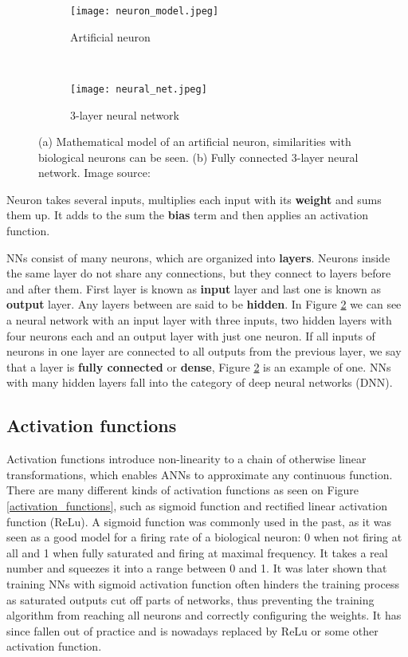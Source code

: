 \begin{figure}[ht] 
    \begin{subfigure}[b]{0.5\textwidth}
        \centering
        \texttt{[image: neuron\_model.jpeg]} 
        \caption{Artificial neuron}
        \label{neuron_model}
    \end{subfigure}
    \unskip\ \vrule\ 
    \begin{subfigure}[b]{0.5\textwidth}
        \centering
        \texttt{[image: neural\_net.jpeg]} 
        \caption{ 3-layer neural network}
        \label{neural_net}
    \end{subfigure}
    
    \caption{ (a) Mathematical model of an artificial neuron, similarities with biological neurons can be seen. (b) Fully connected 3-layer neural network. Image source: \cite{cs231n}}
    \label{neural}
\end{figure}

Neuron takes several inputs, multiplies each input with its \textbf{weight} and sums them up.
It adds to the sum the \textbf{bias} term and then applies an activation function.

NNs consist of many neurons, which are organized into \textbf{layers}.
Neurons inside the same layer do not share any connections, but they connect to layers before and after them.
First layer is known as \textbf{input} layer and last one is known as \textbf{output} layer. 
Any layers between are said to be \textbf{hidden}. 
In Figure \ref{neural_net} we can see a neural network with an input layer with three inputs, two hidden layers with four neurons each and an output layer with just one neuron.
If all inputs of neurons in one layer are connected to all outputs from the previous layer, we say that a layer is \textbf{fully connected} or \textbf{dense}, Figure \ref{neural_net} is an example of one.
NNs with many hidden layers fall into the category of deep neural networks (DNN).


\subsection{ Activation functions}

Activation functions introduce non-linearity to a chain of otherwise linear transformations, which enables ANNs to approximate any continuous function\cite{geron}.
There are many different kinds of activation functions as seen on Figure \ref{activation_functions}, such as sigmoid function and rectified linear activation function (ReLu).
A sigmoid function was commonly used in the past, as it was seen as a good model for a firing rate of a biological neuron: 0 when not firing at all and 1 when fully saturated and firing at maximal frequency\cite{cs231n}.
It takes a real number and squeezes it into a range between 0 and 1.
It was later shown that training NNs with sigmoid activation function often hinders the training process as saturated outputs cut off parts of networks, thus preventing the training algorithm from reaching all neurons and correctly configuring the weights\cite{cs231n}.
It has since fallen out of practice and is nowadays replaced by ReLu or some other activation function.

